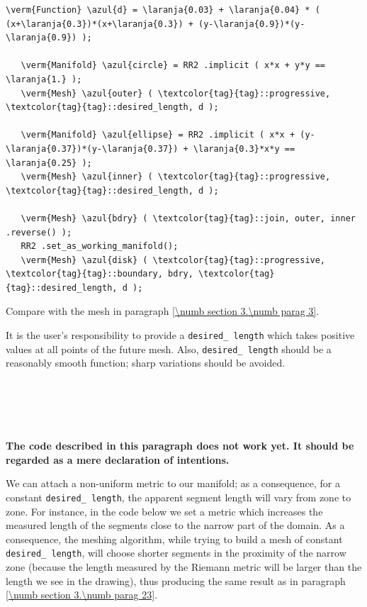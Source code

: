 \begin{Verbatim}[commandchars=\\\{\},formatcom=\small\tt,frame=single,
   label=parag-\ref{\numb section 3.\numb parag 23}.cpp,rulecolor=\color{coment},
   baselinestretch=0.94,framesep=2mm                                            ]
   \verm{Function} \azul{d} = \laranja{0.03} + \laranja{0.04} * ( (x+\laranja{0.3})*(x+\laranja{0.3}) + (y-\laranja{0.9})*(y-\laranja{0.9}) );

   \verm{Manifold} \azul{circle} = RR2 .implicit ( x*x + y*y == \laranja{1.} );
   \verm{Mesh} \azul{outer} ( \textcolor{tag}{tag}::progressive, \textcolor{tag}{tag}::desired_length, d );

   \verm{Manifold} \azul{ellipse} = RR2 .implicit ( x*x + (y-\laranja{0.37})*(y-\laranja{0.37}) + \laranja{0.3}*x*y == \laranja{0.25} );
   \verm{Mesh} \azul{inner} ( \textcolor{tag}{tag}::progressive, \textcolor{tag}{tag}::desired_length, d );

   \verm{Mesh} \azul{bdry} ( \textcolor{tag}{tag}::join, outer, inner .reverse() );
   RR2 .set_as_working_manifold();
   \verm{Mesh} \azul{disk} ( \textcolor{tag}{tag}::progressive, \textcolor{tag}{tag}::boundary, bdry, \textcolor{tag}{tag}::desired_length, d );
\end{Verbatim}

Compare with the mesh in paragraph \ref{\numb section 3.\numb parag 3}.

It is the user's responsibility to provide a {\small\tt desired\_\,length} which takes positive
values at all points of the future mesh.
Also, {\small\tt desired\_\,length} should be a reasonably smooth function;
sharp variations should be avoided.


\section{~~}\label{\numb section 3.\numb parag 24}
 
{\normalfont\bfseries The code described in this paragraph does not work yet.
It should be regarded as a mere declaration of intentions.}
\medskip

We can attach a non-uniform metric to our manifold; as a consequence, for a constant
{\small\tt desired\_\,length}, the apparent segment length will vary from zone to zone.
For instance, in the code below we set a metric which increases the measured length
of the segments close to the narrow part of the domain.
As a consequence, the meshing algorithm, while trying to build a mesh of constant
{\small\tt desired\_\,length}, will choose shorter segments in the proximity of the narrow zone
(because the length measured by the Riemann metric will be larger than the length
we see in the drawing), thus producing the same result as in paragraph
\ref{\numb section 3.\numb parag 23}.

